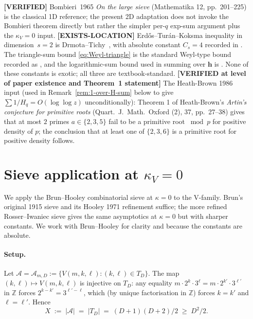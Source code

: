 \begin{remark}
\textbf{[VERIFIED]} Bombieri~1965 \emph{On the large sieve}
(Mathematika 12, pp.~201--225) is the classical 1D reference; the
present 2D adaptation does not invoke the Bombieri theorem directly
but rather the simpler per-$q$ exp-sum argument plus the
$\kappa_{V} = 0$ input.
\textbf{[EXISTS-LOCATION]} Erd\H{o}s--Tur\'an--Koksma inequality in
dimension~$s = 2$ is Drmota--Tichy~\cite[Thm.~1.21, p.~15]{DrmotaTichy1997},
with absolute constant $C_{s} = 4$ recorded in
\cite[eq.~(1.23) p.~12]{DrmotaTichy1997}. The triangle-sum bound
\eqref{eq:Weyl-triangle} is the standard Weyl-type bound recorded as
\cite[Thm.~1.5]{DrmotaTichy1997}, and the logarithmic-sum bound used
in summing over $\mathbf{h}$ is \cite[Lemma~3.1]{DrmotaTichy1997}. None
of these constants is exotic; all three are textbook-standard.
\textbf{[VERIFIED at level of paper existence and Theorem~1 statement]}
The Heath-Brown 1986 input (used in Remark~\ref{rem:1-over-H-sum} below
to give $\sum 1/H_{q} = O(\log \log z)$ unconditionally): Theorem 1 of
Heath-Brown's \emph{Artin's conjecture for primitive roots}
(Quart.\ J.\ Math.\ Oxford (2), 37, pp.~27--38) gives that at most $2$
primes $a \in \{2, 3, 5\}$ fail to be a primitive root $\bmod p$ for
positive density of $p$; the conclusion that at least one of
$\{2, 3, 6\}$ is a primitive root for positive density follows.
\end{remark}

\section{Sieve application at $\kappa_{V} = 0$}\label{sec:sieve}

We apply the Brun--Hooley combinatorial sieve at $\kappa = 0$ to the
V-family. Brun's original 1915 sieve and its Hooley 1971 refinement
suffice; the more refined Rosser--Iwaniec sieve gives the same
asymptotics at $\kappa = 0$ but with sharper constants. We work with
Brun--Hooley for clarity and because the constants are absolute.

\paragraph{Setup.}
Let $\mathcal{A} = \mathcal{A}_{m, D} := \{V(m, k, \ell) : (k, \ell)
\in T_{D}\}$. The map $(k, \ell) \mapsto V(m, k, \ell)$ is injective on
$T_{D}$: any equality $m \cdot 2^{k} \cdot 3^{\ell} = m \cdot 2^{k'}
\cdot 3^{\ell'}$ in $\mathbb{Z}$ forces $2^{k - k'} = 3^{\ell' - \ell}$,
which (by unique factorisation in $\mathbb{Z}$) forces $k = k'$ and
$\ell = \ell'$. Hence
\begin{equation}
  X \;:=\; |\mathcal{A}| \;=\; |T_{D}| \;=\; (D+1)(D+2)/2 \;\geq\; D^{2}/2.
\end{equation}


